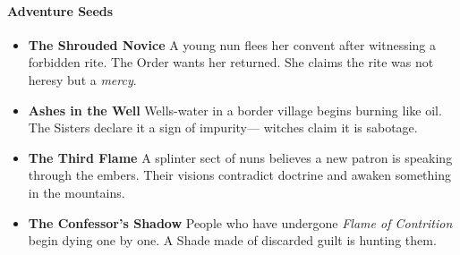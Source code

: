 \documentclass[11pt]{book}
\begin{document}
\paragraph{Adventure Seeds}

\begin{itemize}[leftmargin=1.5em]

    \item \textbf{The Shrouded Novice}  
    A young nun flees her convent after witnessing a forbidden rite.  
    The Order wants her returned. She claims the rite was not heresy  
    but a \emph{mercy}.

    \item \textbf{Ashes in the Well}  
    Wells-water in a border village begins burning like oil.  
    The Sisters declare it a sign of impurity---  
    witches claim it is sabotage.

    \item \textbf{The Third Flame}  
    A splinter sect of nuns believes a new patron is speaking through  
    the embers. Their visions contradict doctrine and awaken something  
    in the mountains.

    \item \textbf{The Confessor's Shadow}  
    People who have undergone \emph{Flame of Contrition} begin dying  
    one by one. A Shade made of discarded guilt is hunting them.

\end{itemize}
\end{document}
